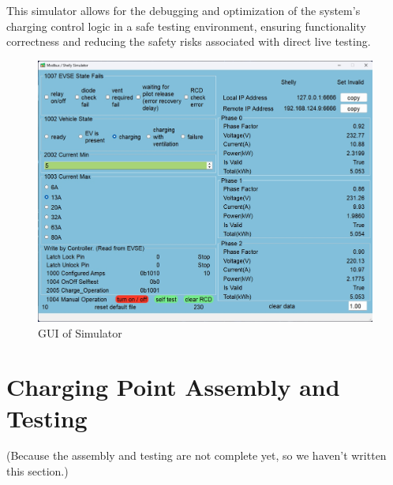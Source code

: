 \documentclass[
english,
ruledheaders=section,%
class=report,%
thesis={type=Report},%
accentcolor=9c,%
custommargins=true,%
marginpar=false,%
parskip=half-,%
fontsize=11pt,%
logofile={img/tuda_logo.pdf}, %
]{tudapub}
\begin{document}
        This simulator allows for the debugging and optimization of the system's charging control logic in a safe testing environment, ensuring functionality correctness and reducing the safety risks associated with direct live testing.
        \begin{figure}[H]
            \centering
            \includegraphics[width=0.5\linewidth]{img/Simulator.png}
            \caption{GUI of Simulator}
            \label{fig:Simulator}
        \end{figure}


        \section{Charging Point Assembly and Testing}
        \label{sec:assembleAndTest}
        (Because the assembly and testing are not complete yet, so we haven't written this section.)








\end{document}
